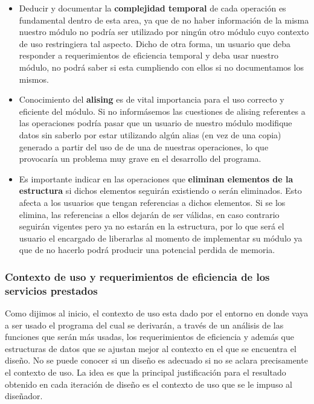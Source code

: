 \documentclass[10pt, a4paper]{report}
\begin{document}
\begin{itemize}
 \item Deducir y documentar la \textbf{complejidad temporal} de cada operaci\'on es fundamental dentro de esta area, ya que de no haber informaci\'on de la misma nuestro m\'odulo no podr\'ia ser utilizado por ning\'un otro m\'odulo cuyo contexto de uso restringiera tal aspecto. Dicho de otra forma, un usuario que deba responder a requerimientos de eficiencia temporal y deba usar nuestro m\'odulo, no podr\'a saber si esta cumpliendo con ellos si no documentamos los mismos.
 \item Conocimiento del \textbf{alising} es de vital importancia para el uso correcto y eficiente del m\'odulo. Si no inform\'asemos las cuestiones de alising referentes a las operaciones podr\'ia pasar que un usuario de nuestro m\'odulo modifique datos sin saberlo por estar utilizando alg\'un alias (en vez de una copia) generado a partir del uso de de una de nuestras operaciones, lo que provocar\'ia un problema muy grave en el desarrollo del programa.
 \item Es importante indicar en las operaciones que \textbf{eliminan elementos de la estructura} si dichos elementos seguir\'an existiendo o ser\'an eliminados. Esto afecta a los usuarios que tengan referencias a dichos elementos. Si se los elimina, las referencias a ellos dejar\'an de ser v\'alidas, en caso contrario seguir\'an vigentes pero ya no estar\'an en la estructura, por lo que ser\'a el usuario el encargado de liberarlas al momento de implementar su m\'odulo ya que de no hacerlo podr\'a producir una potencial perdida de memoria.
\end{itemize}

\subsubsection{Contexto de uso y requerimientos de eficiencia de los servicios prestados}

Como dijimos al inicio, el contexto de uso esta dado por el entorno en donde vaya a ser usado el programa del cual se derivar\'an, a trav\'es de un an\'alisis de las funciones que ser\'an m\'as usadas, los requerimientos de eficiencia y adem\'as que estructuras de datos que se ajustan mejor al contexto en el que se encuentra el dise\~no. No se puede conocer si un dise\~no es adecuado si no se aclara precisamente el contexto de uso. La idea es que la principal justificaci\'on para el resultado obtenido en cada iteraci\'on de dise\~no es el contexto de uso que se le impuso al dise\~nador.
\end{document}
